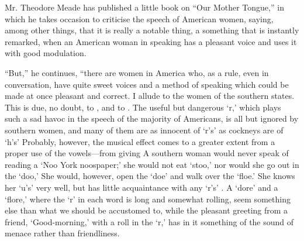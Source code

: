 \begin{ipquote}
\begin{center}
\end{center}
Mr. Theodore Meade has published a little book on “Our Mother Tongue,” in which he takes occasion to criticise the speech of American women, saying, among other things, that it is really a notable thing, a something that is instantly remarked, when an American woman in speaking has a pleasant voice and uses it with good modulation.

“But,” he continues, “there are women in America who, as a rule, even in conversation, have quite sweet voices and a method of speaking which could be made at once pleasant and correct. I allude to the women of the southern states. This is due, no doubt, to , and to . The useful but dangerous ‘r,’ which plays such a sad havoc in the speech of the majority of Americans, is all but ignored by southern women, and many of them are as innocent of ‘r’s’ as cockneys are of ‘h’s’ Probably, however, the musical effect comes to a greater extent from a proper use of the vowels—from giving  A southern woman would never speak of reading a ‘Noo York noospaper;’ she would not eat ‘stoo,’ nor would she go out in the ‘doo,’ She would, however, open the ‘do{\kern0pt}e’ and walk over the ‘flo{\kern0pt}e.’ She knows her ‘u’s’ very well, but has little acquaintance with any ‘r’s’ . A ‘dore’ and a ‘flore,’ where the ‘r’ in each word is long and somewhat rolling, seem something else than what we should be accustomed to, while the pleasant greeting from a friend, ‘Good-morning,’ with a roll in the ‘r,’ has in it something of the sound of menace rather than friendliness.


\end{ipquote}
